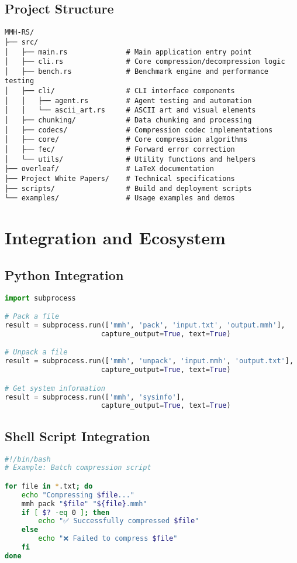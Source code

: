\documentclass[12pt,a4paper]{article}
\begin{document}
\subsection{Project Structure}
\begin{lstlisting}[caption=Directory Structure]
MMH-RS/
├── src/
│   ├── main.rs              # Main application entry point
│   ├── cli.rs               # Core compression/decompression logic
│   ├── bench.rs             # Benchmark engine and performance testing
│   ├── cli/                 # CLI interface components
│   │   ├── agent.rs         # Agent testing and automation
│   │   └── ascii_art.rs     # ASCII art and visual elements
│   ├── chunking/            # Data chunking and processing
│   ├── codecs/              # Compression codec implementations
│   ├── core/                # Core compression algorithms
│   ├── fec/                 # Forward error correction
│   └── utils/               # Utility functions and helpers
├── overleaf/                # LaTeX documentation
├── Project White Papers/    # Technical specifications
├── scripts/                 # Build and deployment scripts
└── examples/                # Usage examples and demos
\end{lstlisting}

\newpage

\section{Integration and Ecosystem}

\subsection{Python Integration}
\begin{lstlisting}[language=Python, caption=Python Integration Example]
import subprocess

# Pack a file
result = subprocess.run(['mmh', 'pack', 'input.txt', 'output.mmh'], 
                       capture_output=True, text=True)

# Unpack a file
result = subprocess.run(['mmh', 'unpack', 'input.mmh', 'output.txt'], 
                       capture_output=True, text=True)

# Get system information
result = subprocess.run(['mmh', 'sysinfo'], 
                       capture_output=True, text=True)
\end{lstlisting}

\subsection{Shell Script Integration}
\begin{lstlisting}[language=bash, caption=Batch Compression Script]
#!/bin/bash
# Example: Batch compression script

for file in *.txt; do
    echo "Compressing $file..."
    mmh pack "$file" "${file}.mmh"
    if [ $? -eq 0 ]; then
        echo "✅ Successfully compressed $file"
    else
        echo "❌ Failed to compress $file"
    fi
done
\end{lstlisting}
\end{document}
